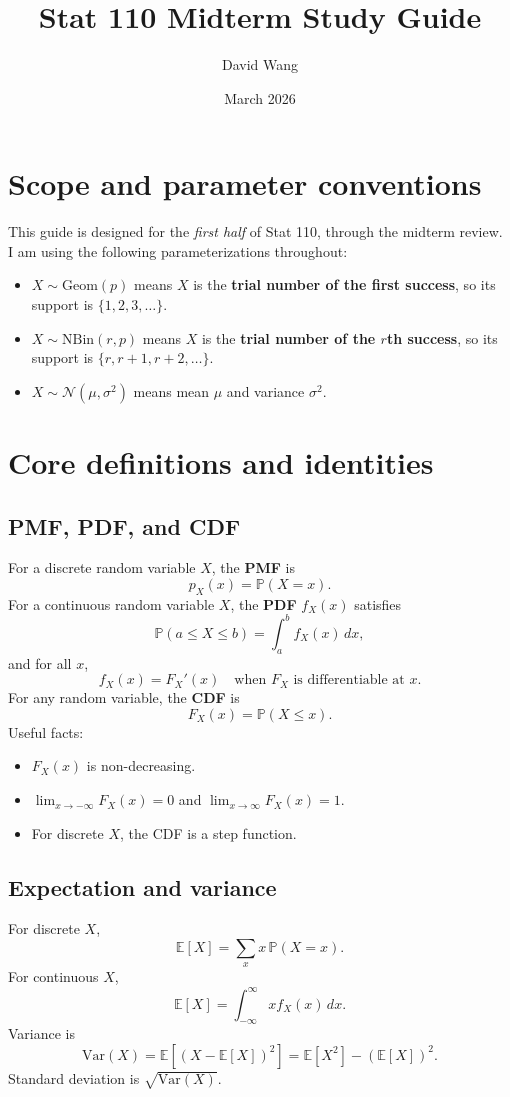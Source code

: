 \documentclass[11pt]{article}
\title{Stat 110 Midterm Study Guide}
\author{David Wang}
\date{March 2026}
\newcommand{\E}{\mathbb{E}}
\newcommand{\Var}{\mathrm{Var}}
\newcommand{\Prob}{\mathbb{P}}
\newcommand{\1}{\mathbf{1}}
\newcommand{\Geom}{\mathrm{Geom}}
\newcommand{\NBin}{\mathrm{NBin}}
\newcommand{\Normal}{\mathcal{N}}
\begin{document}
\maketitle
\tableofcontents

\section{Scope and parameter conventions}
This guide is designed for the \emph{first half} of Stat 110, through the midterm review. I am using the following parameterizations throughout:
\begin{itemize}[leftmargin=1.5em]
    \item $X \sim \Geom(p)$ means $X$ is the \textbf{trial number of the first success}, so its support is $\{1,2,3,\dots\}$.
    \item $X \sim \NBin(r,p)$ means $X$ is the \textbf{trial number of the $r$th success}, so its support is $\{r,r+1,r+2,\dots\}$.
    \item $X \sim \Normal(\mu,\sigma^2)$ means mean $\mu$ and variance $\sigma^2$.
\end{itemize}

\section{Core definitions and identities}

\subsection{PMF, PDF, and CDF}
For a discrete random variable $X$, the \textbf{PMF} is
\[
    p_X(x) = \Prob(X=x).
\]
For a continuous random variable $X$, the \textbf{PDF} $f_X(x)$ satisfies
\[
    \Prob(a \le X \le b) = \int_a^b f_X(x)\,dx,
\]
and for all $x$,
\[
    f_X(x) = F_X'(x) \quad \text{when } F_X \text{ is differentiable at } x.
\]
For any random variable, the \textbf{CDF} is
\[
    F_X(x) = \Prob(X \le x).
\]
Useful facts:
\begin{itemize}[leftmargin=1.5em]
    \item $F_X(x)$ is non-decreasing.
    \item $\lim_{x\to -\infty}F_X(x)=0$ and $\lim_{x\to \infty}F_X(x)=1$.
    \item For discrete $X$, the CDF is a step function.
\end{itemize}

\subsection{Expectation and variance}
For discrete $X$,
\[
    \E[X] = \sum_x x\,\Prob(X=x).
\]
For continuous $X$,
\[
    \E[X] = \int_{-\infty}^{\infty} x f_X(x)\,dx.
\]
Variance is
\[
    \Var(X)=\E[(X-\E[X])^2]=\E[X^2]-(\E[X])^2.
\]
Standard deviation is $\sqrt{\Var(X)}$.
\end{document}
